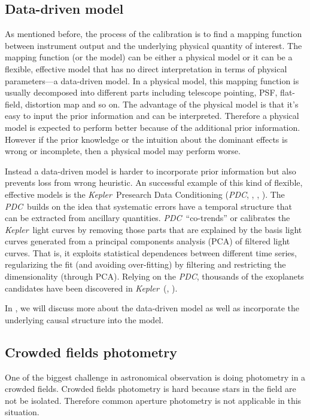 \documentclass[12pt, preprint]{aastex}
\newcommand{\project}[1]{\textsl{#1}}
\newcommand{\kepler}{\project{Kepler}}
\newcommand{\pdc}{\project{PDC}}
\begin{document}
\subsection{Data-driven model}
As mentioned before, the process of the calibration is to find a mapping function between instrument output and the underlying physical quantity of interest.
The mapping function (or the model) can be either a physical model or it can be a flexible, effective model that has no direct interpretation in terms of physical parameters---a data-driven model.
In a physical model, this mapping function is usually decomposed into different parts including telescope pointing, PSF, flat-field, distortion map and so on.
The advantage of the physical model is that it's easy to input the prior information and can be interpreted.
Therefore a physical model is expected to perform better because of the additional prior information.
However if the prior knowledge or the intuition about the dominant effects is wrong or incomplete, then a physical model may perform worse.

Instead a data-driven model is harder to incorporate prior information but also prevents loss from wrong heuristic. 
An successful example of this kind of flexible, effective models is the \kepler\ Presearch Data Conditioning (\pdc, \citealt{pdc1}, \citealt{pdc2}, \citealt{pdc3}). 
The \pdc\ builds on the idea that systematic errors have a temporal structure that can be extracted from ancillary quantities.
\pdc\ ``co-trends'' or calibrates the \kepler\ light curves by removing those parts that are explained by the basis light curves generated from a principal components analysis (PCA) of filtered light curves.
That is, it exploits statistical dependences between different time series, regularizing the fit (and avoiding over-fitting) by filtering and restricting the dimensionality (through PCA).
Relying on the \pdc, thousands of the exoplanets candidates have been discovered in \kepler\ (\citealt{kepler}, \citealt{kepler1}).

In , we will discuss more about the data-driven model as well as incorporate the underlying causal structure into the model.

\subsection{Crowded fields photometry}
One of the biggest challenge in astronomical observation is doing photometry in a crowded fields.
Crowded fields photometry is hard because stars in the field are not be isolated.
Therefore common aperture photometry is not applicable in this situation.
\end{document}
